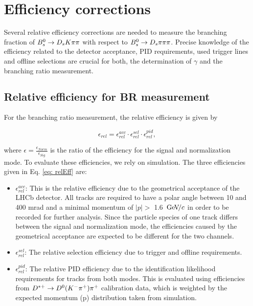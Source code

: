 \section{Efficiency corrections}
\label{sec: efficiency}

Several relative efficiency corrections are needed to measure the branching fraction of ${{B}^0_{s}}\rightarrow{\ensuremath{{D}_{s}}}{\ensuremath{K}}{\ensuremath{\pi}}{\ensuremath{\pi}}$ with respect to ${{B}^0_{s}}\rightarrow{\ensuremath{{D}_{s}}}{\ensuremath{\pi}}{\ensuremath{\pi}}{\ensuremath{\pi}}$. Precise knowledge of the efficiency related to the detector acceptance, PID requirements, used trigger lines and offline selections are crucial for both, the determination of $\gamma$ and the branching ratio measurement.

\subsection{Relative efficiency for BR measurement}
For the branching ratio measurement, the relative efficiency is given by

\begin{equation} 
\epsilon_{rel} = \epsilon^{acc}_{rel}\cdot\epsilon^{sel}_{rel}\cdot\epsilon^{pid}_{rel},
\label{eq: relEff}
\end{equation}

where $\epsilon = \frac{\epsilon_{Norm}}{\epsilon_{Sig}}$ is the ratio of the efficiency for the signal and normalization mode. To evaluate these efficiencies, we rely on simulation. The three efficiencies given in Eq. \ref{eq: relEff} are:

\begin{itemize}

\item $\epsilon^{acc}_{rel}$: This is the relative efficiency due to the geometrical acceptance of the LHCb detector. All tracks are required to have a polar angle between 10 and 400 mrad and a minimal momentum of $|p| >$ 1.6 ${\mathrm{\,Ge\kern -0.1em V\!/}c}$ in order to be recorded for further analysis. Since the particle species of one track differs between the signal and normalization mode, the efficiencies caused by the geometrical acceptance are expected to be different for the two channels.

\item $\epsilon^{sel}_{rel}$: The relative selection efficiency due to trigger and offline requirements. 

\item $\epsilon^{pid}_{rel}$: The relative PID efficiency due to the identification likelihood requirements for tracks from both modes. This is evaluated using efficiencies from ${D}^{*+}\rightarrow D^{0}({{K}^-}{{\pi}^+}){{\pi}^+}$ calibration data, 
which is weighted by the expected momentum (p) distribution taken from simulation.

\end{itemize}

